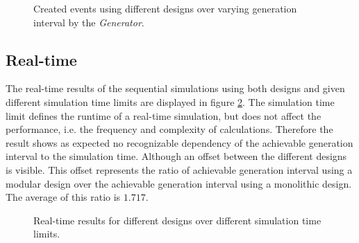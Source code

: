 \begin{figure}
    \centering
    \caption{Created events using different designs over varying generation interval by the \emph{Generator}.}
    \label{fig:results_event_generation}
\end{figure}

\subsection{Real-time}
\label{sec:measurements_sequential_realtime}

The real-time results of the sequential simulations using both designs and given different simulation time limits are displayed in figure \ref{fig:results_realtime_sim_time}.
The simulation time limit defines the runtime of a real-time simulation, but does not affect the performance, i.e. the frequency and complexity of calculations.
Therefore the result shows as expected no recognizable dependency of the achievable generation interval to the simulation time.
Although an offset between the different designs is visible.
This offset represents the ratio of achievable generation interval using a modular design over the achievable generation interval using a monolithic design.
The average of this ratio is $1.717$.\\

\begin{figure}
    \centering
    \caption{Real-time results for different designs over different simulation time limits.}
    \label{fig:results_realtime_sim_time}
\end{figure}

